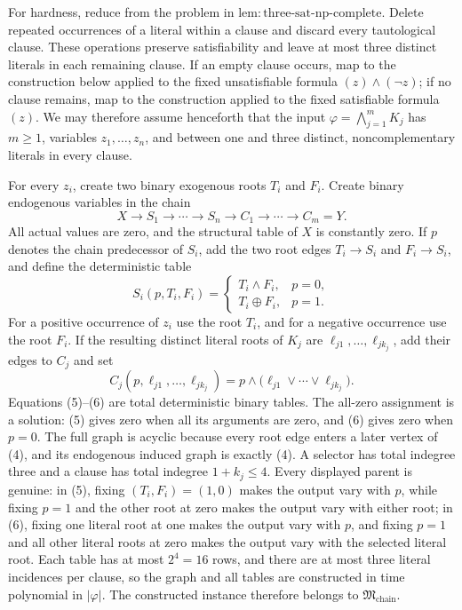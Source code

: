 For hardness, reduce from the problem in \(\mathrm{lem:three\mbox{-}sat\mbox{-}np\mbox{-}complete}\).  Delete repeated occurrences of a literal within a clause and discard every tautological clause.  These operations preserve satisfiability and leave at most three distinct literals in each remaining clause.  If an empty clause occurs, map to the construction below applied to the fixed unsatisfiable formula \((z)\wedge(\neg z)\); if no clause remains, map to the construction applied to the fixed satisfiable formula \((z)\).  We may therefore assume henceforth that the input \(\varphi=\bigwedge_{j=1}^m K_j\) has \(m\ge1\), variables \(z_1,\ldots,z_n\), and between one and three distinct, noncomplementary literals in every clause.

For every \(z_i\), create two binary exogenous roots \(T_i\) and \(F_i\).  Create binary endogenous variables in the chain
\[
 X\longrightarrow S_1\longrightarrow\cdots\longrightarrow S_n
 \longrightarrow C_1\longrightarrow\cdots\longrightarrow C_m=Y.                  \tag{4}
\]
All actual values are zero, and the structural table of \(X\) is constantly zero.  If \(p\) denotes the chain predecessor of \(S_i\), add the two root edges \(T_i\to S_i\) and \(F_i\to S_i\), and define the deterministic table
\[
 S_i(p,T_i,F_i)=
 \begin{cases}
 T_i\wedge F_i,&p=0,\\
 T_i\mathbin\oplus F_i,&p=1.
 \end{cases}                                                                       \tag{5}
\]
For a positive occurrence of \(z_i\) use the root \(T_i\), and for a negative occurrence use the root \(F_i\).  If the resulting distinct literal roots of \(K_j\) are \(\ell_{j1},\ldots,\ell_{jk_j}\), add their edges to \(C_j\) and set
\[
 C_j(p,\ell_{j1},\ldots,\ell_{jk_j})
 =p\wedge\bigl(\ell_{j1}\vee\cdots\vee\ell_{jk_j}\bigr).                       \tag{6}
\]
Equations (5)--(6) are total deterministic binary tables.  The all-zero assignment is a solution: (5) gives zero when all its arguments are zero, and (6) gives zero when \(p=0\).  The full graph is acyclic because every root edge enters a later vertex of (4), and its endogenous induced graph is exactly (4).  A selector has total indegree three and a clause has total indegree \(1+k_j\le4\).  Every displayed parent is genuine: in (5), fixing \((T_i,F_i)=(1,0)\) makes the output vary with \(p\), while fixing \(p=1\) and the other root at zero makes the output vary with either root; in (6), fixing one literal root at one makes the output vary with \(p\), and fixing \(p=1\) and all other literal roots at zero makes the output vary with the selected literal root.  Each table has at most \(2^4=16\) rows, and there are at most three literal incidences per clause, so the graph and all tables are constructed in time polynomial in \(|\varphi|\).  The constructed instance therefore belongs to \(\mathfrak M_{\mathrm{chain}}\).

